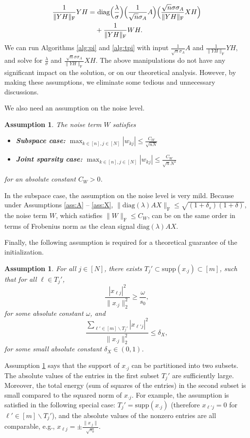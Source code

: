 \documentclass[11pt,journal]{IEEEtran}
\newcommand{\rmF}{\mathrm{F}}
\newcommand{\norm}[1]{\|{#1}\|}
\newcommand{\diag}{\mathrm{diag}}
\newcommand{\supp}{\mathrm{supp}}
\newtheorem{assumption}[theorem]{Assumption}
\begin{document}
\begin{align*}
\frac{1}{\norm{YH}_\rmF} YH  = &~ \diag\Bigl(\frac{\lambda}{\sigma}\Bigr) \Bigl(\frac{1}{\sqrt{n}\sigma_A}A \Bigr) \Bigl(\frac{\sqrt{n}\sigma\sigma_A}{\norm{YH}_\rmF}XH \Bigr) \\
& + \frac{1}{\norm{YH}_\rmF} WH.
\end{align*}
We can run Algorithms \ref{alg:pi} and \ref{alg:tpi} with input $\frac{1}{\sqrt{n}\sigma_A}A$ and $\frac{1}{\norm{YH}_\rmF} YH$, and solve for $\frac{\lambda}{\sigma}$ and $\frac{\sqrt{n}\sigma\sigma_A}{\norm{YH}_\rmF}XH$. 
The above manipulations do not have any significant impact on the solution, or on our theoretical analysis. However, by making these assumptions, we eliminate some tedious and unnecessary discussions.


We also need an assumption on the noise level.
\begin{assumption} \label{ass:W}
The noise term $W$ satisfies
\begin{itemize}
	\item \textbf{Subspace case:} $\max_{k\in [n],j\in[N]} |w_{kj}| \leq \frac{C_W}{\sqrt{nN}}$
	\item \textbf{Joint sparsity case:} $\max_{k\in [n],j\in[N]} |w_{kj}| \leq \frac{C_W}{\sqrt{n}N^2}$
\end{itemize}
for an absolute constant $C_W > 0$.
\end{assumption}
In the subspace case, the assumption on the noise level is very mild. Because under Assumptions \ref{ass:A} -- \ref{ass:X}, $\norm{\diag(\lambda)AX}_\rmF \leq \sqrt{(1+\delta_s)(1+\delta)}$, the noise term $W$, which satisfies $\norm{W}_\rmF \leq C_W$, can be on the same order in terms of Frobenius norm as the clean signal $\diag(\lambda)AX$.


Finally, the following assumption is required for a theoretical guarantee of the initialization.
\begin{assumption} \label{ass:X_flat}
For all $j\in [N]$, there exists $T_j'\subset \supp(x_{\cdot j}) \subset[m]$, such that for all $\ell \in T_j'$,
\[
\frac{|x_{\ell j}|^2}{\norm{x_{\cdot j}}_2^2} \geq \frac{\omega}{s_0},
\]
for some absolute constant $\omega$, and 
\[
\frac{\sum_{\ell'\in [m]\backslash T_j'}|x_{\ell' j}|^2}{\norm{x_{\cdot j}}_2^2} \leq \delta_X,
\]
for some small absolute constant $\delta_X \in (0,1)$.
\end{assumption}
Assumption \ref{ass:X_flat} says that the support of $x_{\cdot j}$ can be partitioned into two subsets. The absolute values of the entries in the first subset $T_j'$ are sufficiently large. Moreover, the total energy (sum of squares of the entries) in the second subset is small compared to the squared norm of $x_{\cdot j}$.
For example, the assumption is satisfied in the following special case: $T_j'=\supp(x_{\cdot j})$ (therefore $x_{\ell' j} = 0$ for $\ell'\in [m]\backslash T_j'$), and the absolute values of the nonzero entries are all comparable, e.g., $x_{\ell j} = \pm \frac{\norm{x_{\cdot j}}}{\sqrt{s_0}}$.
\end{document}
